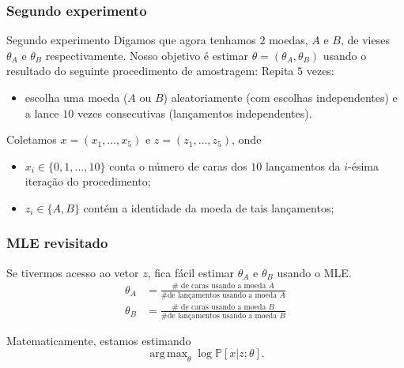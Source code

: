 \documentclass{beamer}
\newcommand{\Prob}{\mathbb{P}}
\DeclareMathOperator*{\argmax}{arg\,max}
\begin{document}
\begin{frame}

	\frametitle{Segundo experimento}
	\begin{block}{Segundo experimento}
	Digamos que agora tenhamos $2$ moedas, $A$ e $B$, de vieses $\theta_A$
	e $\theta_B$ respectivamente. Nosso objetivo é estimar $\theta=(\theta_A,
	\theta_B)$ usando o resultado do seguinte procedimento de amostragem:
	\pause
	\medskip
	Repita $5$ vezes:
	\begin{itemize}
		\item escolha uma moeda ($A$ ou $B$) aleatoriamente (com escolhas
		independentes) e a lance $10$ vezes consecutivas (lançamentos
		independentes).
	\end{itemize}
	\end{block}
	\pause
	Coletamos $x=(x_1,\ldots, x_5)$ e $z=(z_1,\ldots, z_5)$, onde
	\begin{itemize}
		\item $x_i\in \{0,1,\ldots, 10\}$ conta o número de caras
		dos $10$ lançamentos da $i$-ésima iteração do procedimento;
		\pause
		\item $z_i\in \{A,B\}$ contém a identidade da moeda de tais
		lançamentos;
	\end{itemize}

\end{frame}

\begin{frame}

	\frametitle{MLE revisitado}
	Se tivermos acesso ao vetor $z$, fica fácil estimar $\theta_A$ e $\theta_B$
	usando o MLE.
	\pause
	\begin{align*}
	  \theta_A &= \frac{\# \text{ de caras usando a moeda } A}{
	  	                \# \text{de lançamentos usando a moeda } A} \\
	  \theta_B &= \frac{\# \text{ de caras usando a moeda } B}{
	  	\# \text{de lançamentos usando a moeda } B}
	\end{align*}
	\pause

	\bigskip
	Matematicamente, estamos estimando
	\[
	  \argmax_{\theta} \log \Prob[x|z; \theta].
	\]

\end{frame}
\end{document}
